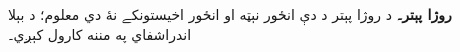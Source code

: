 \textbf{روژا پېتر۔} د روژا پېتر د دې انځور نېټه او انځور اخيستونکے نۀ دي معلوم؛ د بېلا اندراشفاي په مننه کارول کېږي۔
